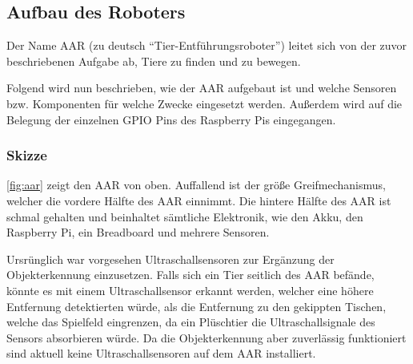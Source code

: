 \subsection{Aufbau des Roboters}

Der Name \ac{AAR} (zu deutsch \enquote{Tier-Entführungsroboter}) leitet sich von der zuvor beschriebenen Aufgabe ab, Tiere zu finden und zu bewegen.

Folgend wird nun beschrieben, wie der \ac{AAR} aufgebaut ist und welche Sensoren bzw. Komponenten für welche Zwecke eingesetzt werden.
Außerdem wird auf die Belegung der einzelnen \ac{GPIO} Pins des Raspberry Pis eingegangen.

\subsubsection{Skizze}


\autoref{fig:aar} zeigt den \ac{AAR} von oben.
Auffallend ist der größe Greifmechanismus, welcher die vordere Hälfte des \ac{AAR} einnimmt.
Die hintere Hälfte des \ac{AAR} ist schmal gehalten und beinhaltet sämtliche Elektronik, wie den Akku, den Raspberry Pi, ein Breadboard und mehrere Sensoren. 

Ursrünglich war vorgesehen Ultraschallsensoren zur Ergänzung der Objekterkennung einzusetzen.
Falls sich ein Tier seitlich des \ac{AAR} befände, könnte es mit einem Ultraschallsensor erkannt werden, welcher eine höhere Entfernung detektierten würde, als die Entfernung zu den gekippten Tischen, welche das Spielfeld eingrenzen, da ein Plüschtier die Ultraschallsignale des Sensors absorbieren würde.
Da die Objekterkennung aber zuverlässig funktioniert sind aktuell keine Ultraschallsensoren auf dem \ac{AAR} installiert.

